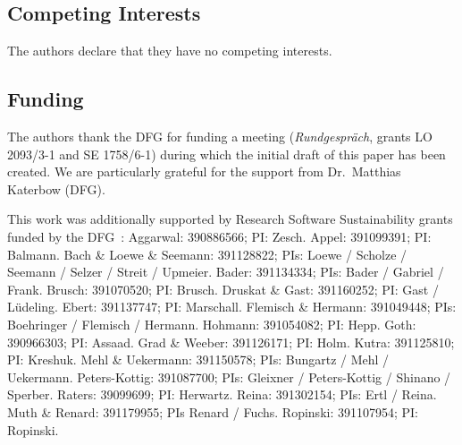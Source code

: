 \documentclass[a4paper,num-refs,numbers,sort&compress]{de-rse}
\begin{document}

\subsection{Competing Interests}
The authors declare that they have no competing interests.



\subsection{Funding}
The authors thank the DFG for funding a meeting (\textit{Rundgespr\"{a}ch}, grants LO
2093/3-1 and SE 1758/6-1) %
during which the initial draft of this paper has been created. We are particularly grateful for the support from Dr.\ Matthias Katerbow (DFG).

This work was additionally supported by Research Software Sustainability grants funded by the DFG~\cite{DFGfunded}:
    Aggarwal: 390886566; PI: Zesch.
    Appel: 391099391; PI: Balmann.
    Bach \& Loewe \& Seemann: 391128822; PIs: Loewe / Scholze / Seemann / Selzer / Streit / Upmeier.
    Bader: 391134334; PIs: Bader / Gabriel / Frank.
    Brusch: 391070520; PI: Brusch.
    Druskat \& Gast: 391160252; PI: Gast / L\"udeling.
    Ebert: 391137747; PI: Marschall.
    Flemisch \& Hermann: 391049448; PIs: Boehringer / Flemisch / Hermann.
    Hohmann: 391054082; PI: Hepp.
    Goth: 390966303; PI: Assaad.
    Grad \& Weeber: 391126171; PI: Holm.
    Kutra: 391125810; PI: Kreshuk.
    Mehl \& Uekermann: 391150578; PIs: Bungartz / Mehl / Uekermann.  
    Peters-Kottig: 391087700; PIs: Gleixner / Peters-Kottig / Shinano / Sperber.
    Raters: 39099699; PI: Herwartz.
    Reina: 391302154; PIs: Ertl / Reina.
    Muth \& Renard: 391179955; PIs Renard / Fuchs.
    Ropinski: 391107954; PI: Ropinski.
\end{document}
